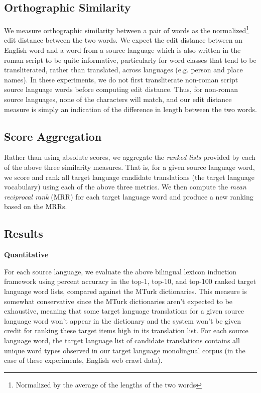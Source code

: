 \documentclass[11pt]{article}
\begin{document}
\subsection{Orthographic Similarity} 
We measure orthographic similarity between a pair of words as the normalized\footnote{Normalized by the average of the lengths of the two words} edit distance between the two words. We expect the edit distance between an English word and a word from a source language which is also written in the roman script to be quite informative, particularly for word classes that tend to be transliterated, rather than translated, across languages (e.g. person and place names). In these experiments, we do not first transliterate non-roman script source language words before computing edit distance. Thus, for non-roman source languages, none of the characters will match, and our edit distance measure is simply an indication of the difference in length between the two words. 

\subsection{Score Aggregation} 
Rather than using absolute scores, we aggregate the {\it ranked lists} provided by each of the above three similarity measures. That is, for a given source language word, we score and rank all target language candidate translations (the target language vocabulary) using each of the above three metrics. We then compute the {\it mean reciprocal rank} (MRR) for each target language word and produce a new ranking based on the MRRs.

\subsection{Results}

{\bf Quantitative} 

For each source language, we evaluate the above bilingual lexicon induction framework using percent accuracy in the top-1, top-10, and top-100 ranked target language word lists, compared against the MTurk dictionaries. This measure is somewhat conservative since the MTurk dictionaries aren't expected to be exhaustive, meaning that some target language translations for a given source language word won't appear in the dictionary and the system won't be given credit for ranking these target items high in its translation list. For each source language word, the target language list of candidate translations contains all unique word types observed in our target language monolingual corpus (in the case of these experiments, English web crawl data). 
\end{document}
